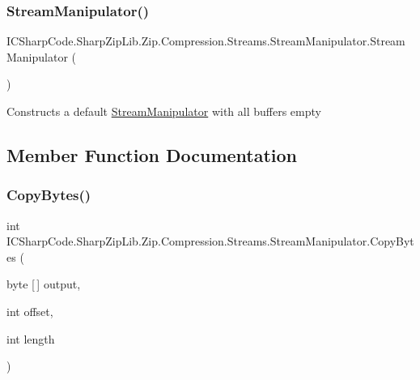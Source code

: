 \subsubsection{\texorpdfstring{Stream\+Manipulator()}{StreamManipulator()}\hspace{0.1cm}{\footnotesize\ttfamily [2/2]}}
{\footnotesize\ttfamily I\+C\+Sharp\+Code.\+Sharp\+Zip\+Lib.\+Zip.\+Compression.\+Streams.\+Stream\+Manipulator.\+Stream\+Manipulator (\begin{DoxyParamCaption}{ }\end{DoxyParamCaption})\hspace{0.3cm}{\ttfamily [inline]}}



Constructs a default \hyperlink{class_i_c_sharp_code_1_1_sharp_zip_lib_1_1_zip_1_1_compression_1_1_streams_1_1_stream_manipulator}{Stream\+Manipulator} with all buffers empty 



\subsection{Member Function Documentation}
\mbox{\label{class_i_c_sharp_code_1_1_sharp_zip_lib_1_1_zip_1_1_compression_1_1_streams_1_1_stream_manipulator_accdce04e996a38567367c80aa2c9b6f6}} 
\subsubsection{\texorpdfstring{Copy\+Bytes()}{CopyBytes()}\hspace{0.1cm}{\footnotesize\ttfamily [1/2]}}
{\footnotesize\ttfamily int I\+C\+Sharp\+Code.\+Sharp\+Zip\+Lib.\+Zip.\+Compression.\+Streams.\+Stream\+Manipulator.\+Copy\+Bytes (\begin{DoxyParamCaption}\item[{byte \mbox{[}$\,$\mbox{]}}]{output,  }\item[{int}]{offset,  }\item[{int}]{length }\end{DoxyParamCaption})\hspace{0.3cm}{\ttfamily [inline]}}



